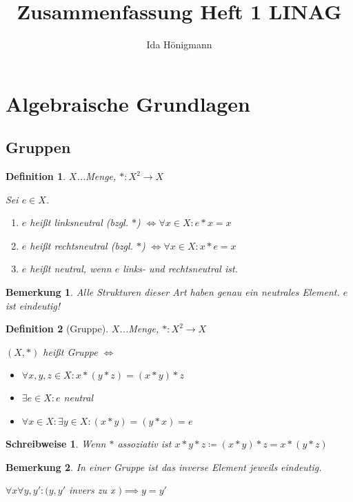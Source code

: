 \documentclass[twocolumn]{article}
\title{Zusammenfassung Heft 1 LINAG}
\author{Ida Hönigmann}
\newtheorem{definition}{Definition}[section]
\newtheorem*{remark}{Bemerkung}
\newtheorem*{schreibweise}{Schreibweise}
\newcommand*{\logeq}{\Leftrightarrow}
\begin{document}
\maketitle

\section{Algebraische Grundlagen}
\subsection{Gruppen}
\begin{definition}
	$X$...Menge, $*:X^{2}\rightarrow X$
	
	Sei $e \in X$.
	\begin{enumerate}
		\item $e$ heißt linksneutral (bzgl. $*$) $\logeq \forall x \in X : e * x = x$
		\item $e$ heißt rechtsneutral (bzgl. $*$) $\logeq \forall x \in X : x * e = x$
		\item $e$ heißt neutral, wenn $e$ links- und rechtsneutral ist.
	\end{enumerate}
\end{definition}

\begin{remark}
	Alle Strukturen dieser Art haben genau ein neutrales Element. $e$ ist eindeutig!
\end{remark}

\begin{definition}[Gruppe]
	$X$...Menge, $*:X^{2}\rightarrow X$
	
	$(X,*)$ heißt Gruppe $\logeq$
	\begin{itemize}
		\item $\forall x,y,z \in X : x*(y*z)=(x*y)*z$
		\item $\exists e \in X : e$ neutral
		\item $\forall x \in X : \exists y \in X : (x*y)=(y*x)=e$
	\end{itemize}
\end{definition}

\begin{schreibweise}
	Wenn $*$ assoziativ ist $x*y*z \coloneqq (x*y)*z = x*(y*z)$
\end{schreibweise}

\begin{remark}
	In einer Gruppe ist das inverse Element jeweils eindeutig.
	
	$\forall x \forall y,y' : (y,y'$ invers zu x $) \implies y = y'$
\end{remark}
\end{document}
